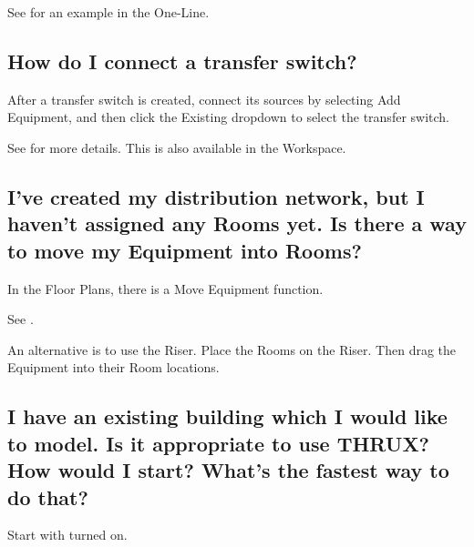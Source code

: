\documentclass[letterpaper,10pt,english]{sphinxmanual}
\begin{document}
See {\hyperref[\detokenize{docs/userguide/buildingelectricalmodel/one-line/index-one-line:one-line-bus-duct}]{}} for an example in the One-Line.


\subsection{How do I connect a transfer switch?}
\label{\detokenize{docs/faq:how-do-i-connect-a-transfer-switch}}
After a transfer switch is created, connect its sources by selecting Add Equipment, and then click the Existing dropdown to select the transfer switch.

See {\hyperref[\detokenize{docs/userguide/buildingelectricalmodel/one-line/index-one-line:one-line-transfer-switch}]{}} for more details.  This is also available in the {\hyperref[\detokenize{docs/userguide/buildingelectricalmodel/schedules/index-schedules::doc}]{}} Workspace.


\subsection{I’ve created my distribution network, but I haven’t assigned any Rooms yet.  Is there a way to move my Equipment into Rooms?}
\label{\detokenize{docs/faq:i-ve-created-my-distribution-network-but-i-haven-t-assigned-any-rooms-yet-is-there-a-way-to-move-my-equipment-into-rooms}}
In the Floor Plans, there is a Move Equipment function.

See {\hyperref[\detokenize{docs/userguide/definingarchitecturalelements/floorplans/index-floor-plans:floor-plans-move-equipment}]{}}.

An alternative is to use the Riser.  Place the Rooms on the Riser.  Then drag the Equipment into their Room locations.


\subsection{I have an existing building which I would like to model.  Is it appropriate to use THRUX?  How would I start?  What’s the fastest way to do that?}
\label{\detokenize{docs/faq:i-have-an-existing-building-which-i-would-like-to-model-is-it-appropriate-to-use-thrux-how-would-i-start-what-s-the-fastest-way-to-do-that}}
Start with {\hyperref[\detokenize{docs/userguide/explorersandutilitytools/statusbar/index-status_bar:design-assistance}]{}} turned on.
\end{document}
